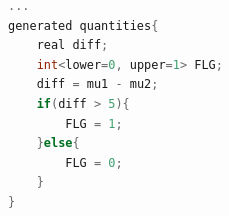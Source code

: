 \begin{lstlisting}[language=C++,label={stan::19_04},caption={生成量ブロックの利用}]
    ...
generated quantities{
    real diff;
    int<lower=0, upper=1> FLG;
    diff = mu1 - mu2;
    if(diff > 5){
        FLG = 1;
    }else{
        FLG = 0;
    }
}

\end{lstlisting}
